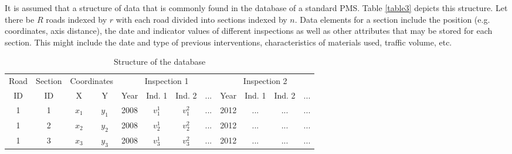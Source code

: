 \documentclass[Journal]{ascelike}
\begin{document}
It is assumed that a structure of data that is commonly found in 
the database of a standard PMS. Table \ref{table3} depicts this structure. Let there be $R$ roads indexed by $r$ with each road  
divided into sections indexed by $n$. Data elements for a section include the position (e.g. coordinates, axis 
distance), the date and indicator values of different inspections as well as other attributes that may be stored for 
each section. This might include the date and type of previous interventions, characteristics of materials used, traffic volume, 
etc.


\begin{table}[htbp]
\begin{center}
\caption{Structure of the database}
\begin{tabular}{l|l|l|l|l|l|l|l|l|l|l|l}
\hline
\multicolumn{1}{c|}{Road} & \multicolumn{1}{c|}{Section} & \multicolumn{2}{c|}{Coordinates} & \multicolumn{4}{c|}{Inspection 1} & \multicolumn{4}{c}{Inspection 2} \\ 
\cline{3-12}
\multicolumn{1}{c|}{ID} & \multicolumn{1}{c|}{ID } & \multicolumn{1}{c|}{ X } & \multicolumn{1}{c|}{ Y } & \multicolumn{1}{c|}{Year } & \multicolumn{1}{c|}{ Ind. 1 } & \multicolumn{1}{c|}{ Ind. 2 } & \multicolumn{1}{c|}{ ... } & \multicolumn{1}{c|}{Year} & \multicolumn{1}{c|}{ Ind. 1 } & \multicolumn{1}{c|}{ Ind. 2 } & \multicolumn{1}{c}{ ... } \\ 
\hline
\multicolumn{1}{c|}{1} & \multicolumn{1}{c|}{1} & \multicolumn{1}{c|}{$x_1$} & \multicolumn{1}{c|}{$y_1$} & \multicolumn{1}{c|}{2008} & \multicolumn{1}{c|}{$v_1^1$} & \multicolumn{1}{c|}{$v_1^2$} & \multicolumn{1}{c|}{ ... } & \multicolumn{1}{c|}{2012} & \multicolumn{1}{c|}{ ... } & \multicolumn{1}{c|}{ ... } & \multicolumn{1}{c}{ ... } \\ 
\multicolumn{1}{c|}{1} & \multicolumn{1}{c|}{2} & \multicolumn{1}{c|}{$x_2$} & \multicolumn{1}{c|}{$y_2$} & \multicolumn{1}{c|}{2008} & \multicolumn{1}{c|}{$v_2^1$} & \multicolumn{1}{c|}{$v_2^2$} & \multicolumn{1}{c|}{ ... } & \multicolumn{1}{c|}{2012} & \multicolumn{1}{c|}{ ... } & \multicolumn{1}{c|}{ ... } & \multicolumn{1}{c}{ ... } \\ 
\multicolumn{1}{c|}{1} & \multicolumn{1}{c|}{3} & \multicolumn{1}{c|}{$x_3$} & \multicolumn{1}{c|}{$y_3$} & \multicolumn{1}{c|}{2008} & \multicolumn{1}{c|}{$v_3^1$} & \multicolumn{1}{c|}{$v_3^2$} & \multicolumn{1}{c|}{ ... } & \multicolumn{1}{c|}{2012} & \multicolumn{1}{c|}{ ... } & \multicolumn{1}{c|}{ ... } & \multicolumn{1}{c}{ ... } \\ 

\end{tabular}
\end{center}
\end{table}
\end{document}
